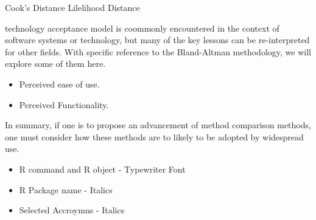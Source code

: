 Cook's Distance
Lilelihood Distance


technology acceptance model is coommonly encountered in the context of software systems or technology, but many of the key lessons can be re-interpreted for other 
fields. With specific reference to the Bland-Altman methodology, we will explore some of them here.

\begin{itemize}
\item Perceived ease of use.
\item Perceived Functionality.
\end{itemize}


In summary, if one is to propose an advancement of method comparison methods, one must consider how these methods are to likely to be adopted by widespread use. 







\begin{itemize}
\item R command and R object - Typewriter Font
\item R Package name - Italics
\item Selected Accroymns - Italics
\end{itemize}

